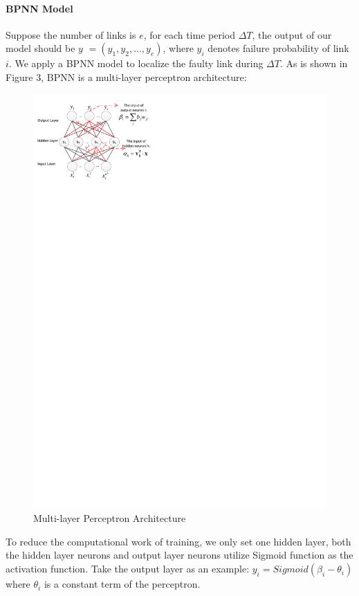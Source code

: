 \documentclass{sig-alternate-05-2015}
\begin{document}
\paragraph{BPNN Model}
Suppose the number of links is $e$, for each time period $\Delta T$, the output of our model should be
\boldmath $y$ 
\unboldmath $=(y_1, y_2, ..., y_e)$, where $y_i$ denotes failure probability of link $i$. We apply a BPNN model to localize the faulty link during $\Delta T$. As is shown in Figure 3, BPNN is a multi-layer perceptron architecture:
\begin{figure}
  \centering
  \includegraphics{ANN}
  \caption{Multi-layer Perceptron Architecture}
\end{figure}
To reduce the computational work of training, we only set one hidden layer, both the hidden layer neurons and output layer neurons utilize Sigmoid function as the activation function. Take the output layer as an example:
$y_i = Sigmoid(\beta_i - \theta_i)$ where $\theta_i$ is a constant term of the perceptron.
\end{document}
